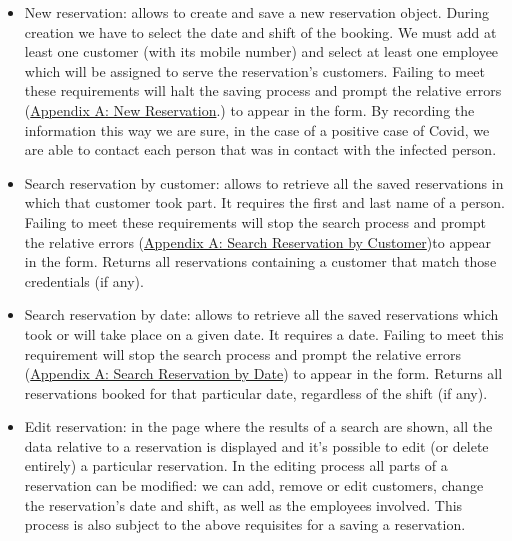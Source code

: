 \documentclass{article}
\begin{document}
\begin{itemize}
  \item New reservation: allows to create and save a new reservation object.
  		During creation we have to select the date and shift of the booking.
  		We must add at least one customer (with its mobile
  		number) and select at least one employee which will be assigned to serve 
  		the reservation's customers. 
  		Failing to meet these requirements will halt the saving 
  		process and prompt the relative errors  
  		(\hyperref[sec:new_reservation_form_errors]{Appendix A: New Reservation}.)
  		 to appear in the form.
  		By recording the information this way we are sure, in the case of 
  		a positive case of Covid, we are able to contact each person that 
  		was in contact with the infected person.
  

   \item Search reservation by customer: allows to retrieve all the saved 
   		reservations in which that customer took part.
   		It requires the first and last name of a person.
   		Failing to meet these requirements will stop the search process 
   		and prompt the relative errors
   		 (\hyperref[sec:search_reservation_by_customer_errors]
   		{Appendix A: Search Reservation by Customer})to appear in the form.
   		Returns all reservations containing a customer that match
   		those credentials (if any).
   
   \item Search reservation by date: allows to retrieve all the saved reservations
   		which took or will take place on a given date.
		It requires a date. Failing to meet this requirement will stop the search
		process and prompt the relative errors
		(\hyperref[sec:search_reservation_by_date_errors]{Appendix A: Search Reservation
		 by Date}) to appear in the form.   		
   		Returns all reservations booked for that particular date, 
   		regardless of the shift (if any).		 
   	
   \item Edit reservation: in the page where the results of a search are shown, 
   		all the data relative to a reservation is displayed and it's possible 
   		to edit (or delete entirely) a particular reservation.
   		In the editing process all parts of a reservation can be modified: 
   		we can add, remove or edit customers, change the reservation's date and shift,
   		as well as the employees involved. This process is also subject to the 
   		above requisites for a saving a reservation.
\end{itemize}
\end{document}
